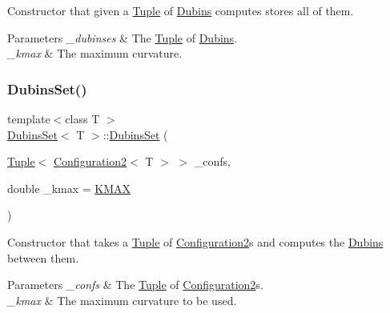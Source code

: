 Constructor that given a {\ttfamily \mbox{\hyperlink{class_tuple}{Tuple}}} of {\ttfamily \mbox{\hyperlink{class_dubins}{Dubins}}} computes stores all of them. 
\begin{DoxyParams}{Parameters}
{\em \+\_\+dubinses} & The {\ttfamily \mbox{\hyperlink{class_tuple}{Tuple}}} of {\ttfamily \mbox{\hyperlink{class_dubins}{Dubins}}}. \\
\hline
{\em \+\_\+kmax} & The maximum curvature. \\
\hline
\end{DoxyParams}
\mbox{\label{class_dubins_set_a60ae5e28b776ad39e965d4019e448d94}} 
\subsubsection{\texorpdfstring{DubinsSet()}{DubinsSet()}\hspace{0.1cm}{\footnotesize\ttfamily [2/4]}}
{\footnotesize\ttfamily template$<$class T $>$ \\
\mbox{\hyperlink{class_dubins_set}{Dubins\+Set}}$<$ T $>$\+::\mbox{\hyperlink{class_dubins_set}{Dubins\+Set}} (\begin{DoxyParamCaption}\item[{\mbox{\hyperlink{class_tuple}{Tuple}}$<$ \mbox{\hyperlink{class_configuration2}{Configuration2}}$<$ T $>$ $>$}]{\+\_\+confs,  }\item[{double}]{\+\_\+kmax = {\ttfamily \mbox{\hyperlink{dubins_8hh_a940b85a83458e94519f2685b33ddd276}{K\+M\+AX}}} }\end{DoxyParamCaption})\hspace{0.3cm}{\ttfamily [inline]}}

Constructor that takes a {\ttfamily \mbox{\hyperlink{class_tuple}{Tuple}}} of {\ttfamily \mbox{\hyperlink{class_configuration2}{Configuration2}}}s and computes the {\ttfamily \mbox{\hyperlink{class_dubins}{Dubins}}} between them. 
\begin{DoxyParams}{Parameters}
{\em \+\_\+confs} & The {\ttfamily \mbox{\hyperlink{class_tuple}{Tuple}}} of {\ttfamily \mbox{\hyperlink{class_configuration2}{Configuration2}}}s. \\
\hline
{\em \+\_\+kmax} & The maximum curvature to be used. \\
\hline
\end{DoxyParams}
\mbox{\label{class_dubins_set_a209e9ffddb76419c3ac103afb73b2b10}} 
